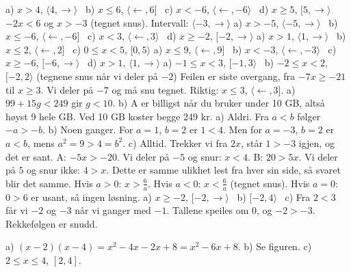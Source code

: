 
 a) $x > 4$, $\langle 4, \rightarrow\rangle$ \ b) $x \le 6$, $\langle\leftarrow, 6]$ \ c) $x < -6$, $\langle\leftarrow, -6\rangle$ \ d) $x \ge 5$, $[5, \rightarrow\rangle$
 $-2x < 6$ og $x > -3$ (tegnet snus). Intervall: $\langle -3, \rightarrow\rangle$
 a) $x > -5$, $\langle -5, \rightarrow\rangle$ \ b) $x \le -6$, $\langle\leftarrow, -6]$ \ c) $x < 3$, $\langle\leftarrow, 3\rangle$ \ d) $x \ge -2$, $[-2, \rightarrow\rangle$
 a) $x > 1$, $\langle 1, \rightarrow\rangle$ \ b) $x \le 2$, $\langle\leftarrow, 2]$ \ c) $0 \le x < 5$, $[0, 5\rangle$
 a) $x \le 9$, $\langle\leftarrow, 9]$ \ b) $x < -3$, $\langle\leftarrow, -3\rangle$ \ c) $x \ge -6$, $[-6, \rightarrow\rangle$ \ d) $x > 1$, $\langle 1, \rightarrow\rangle$
 a) $-1 \le x < 3$, $[-1, 3\rangle$ \ b) $-2 \le x < 2$, $[-2, 2\rangle$ (tegnene snus når vi deler på $-2$)
 Feilen er siste overgang, fra $-7x \ge -21$ til $x \ge 3$. Vi deler på $-7$ og må snu tegnet. Riktig: $x \le 3$, $\langle\leftarrow, 3]$.
 a) $99 + 15g < 249$ gir $g < 10$. b) A er billigst når du bruker under 10 GB, altså høyst 9 hele GB. Ved 10 GB koster begge 249 kr.
 a) Aldri. Fra $a < b$ følger $-a > -b$. b) Noen ganger. For $a = 1$, $b = 2$ er $1 < 4$. Men for $a = -3$, $b = 2$ er $a < b$, mens $a^2 = 9 > 4 = b^2$. c) Alltid. Trekker vi fra $2x$, står $1 > -3$ igjen, og det er sant.
 A: $-5x > -20$. Vi deler på $-5$ og snur: $x < 4$. B: $20 > 5x$. Vi deler på $5$ og snur ikke: $4 > x$. Dette er samme ulikhet lest fra hver sin side, så svaret blir det samme.
 Hvis $a > 0$: $x > \frac{6}{a}$. Hvis $a < 0$: $x < \frac{6}{a}$ (tegnet snus). Hvis $a = 0$: $0 > 6$ er usant, så ingen løsning.
 a) $x \ge -2$, $[-2, \rightarrow\rangle$ \ b) $[-2, 4\rangle$ \ c) Fra $2 < 3$ får vi $-2$ og $-3$ når vi ganger med $-1$. Tallene speiles om 0, og $-2 > -3$. Rekkefølgen er snudd.

 a) $(x-2)(x-4) = x^2 - 4x - 2x + 8 = x^2 - 6x + 8$. b) Se figuren. c) $2 \le x \le 4$, $[2, 4]$.

